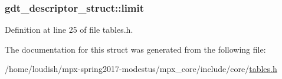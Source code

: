 \subsubsection[{\texorpdfstring{limit}{limit}}]{ gdt\+\_\+descriptor\+\_\+struct\+::limit}\hypertarget{structgdt__descriptor__struct_a3c8ae013805dd982b25f0d62e3cdee0e}{}\label{structgdt__descriptor__struct_a3c8ae013805dd982b25f0d62e3cdee0e}


Definition at line 25 of file tables.\+h.



The documentation for this struct was generated from the following file\+:\begin{DoxyCompactItemize}
\item 
/home/loudish/mpx-\/spring2017-\/modestus/mpx\+\_\+core/include/core/\hyperlink{tables_8h}{tables.\+h}\end{DoxyCompactItemize}
